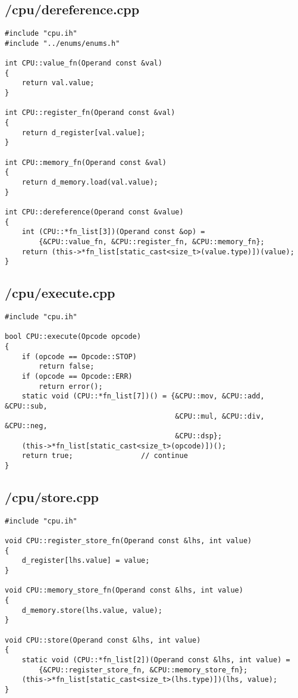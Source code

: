 \documentclass{article}
\begin{document}
\subsection*{/cpu/dereference.cpp}
\begin{verbatim}
#include "cpu.ih"
#include "../enums/enums.h"

int CPU::value_fn(Operand const &val)
{
    return val.value;
}

int CPU::register_fn(Operand const &val)
{
    return d_register[val.value];
}

int CPU::memory_fn(Operand const &val)
{
    return d_memory.load(val.value);
}

int CPU::dereference(Operand const &value)
{
    int (CPU::*fn_list[3])(Operand const &op) = 
        {&CPU::value_fn, &CPU::register_fn, &CPU::memory_fn};
    return (this->*fn_list[static_cast<size_t>(value.type)])(value);
}

\end{verbatim}
\subsection*{/cpu/execute.cpp}
\begin{verbatim}
#include "cpu.ih"

bool CPU::execute(Opcode opcode)
{
    if (opcode == Opcode::STOP)
        return false;
    if (opcode == Opcode::ERR)
        return error();
    static void (CPU::*fn_list[7])() = {&CPU::mov, &CPU::add, &CPU::sub, 
                                        &CPU::mul, &CPU::div, &CPU::neg, 
                                        &CPU::dsp};
    (this->*fn_list[static_cast<size_t>(opcode)])();
    return true;                // continue
}
\end{verbatim}
\subsection*{/cpu/store.cpp}
\begin{verbatim}
#include "cpu.ih"

void CPU::register_store_fn(Operand const &lhs, int value)
{
    d_register[lhs.value] = value;
}

void CPU::memory_store_fn(Operand const &lhs, int value)
{
    d_memory.store(lhs.value, value);
}

void CPU::store(Operand const &lhs, int value)
{
    static void (CPU::*fn_list[2])(Operand const &lhs, int value) = 
        {&CPU::register_store_fn, &CPU::memory_store_fn};
    (this->*fn_list[static_cast<size_t>(lhs.type)])(lhs, value);
}   
\end{verbatim}
\end{document}
